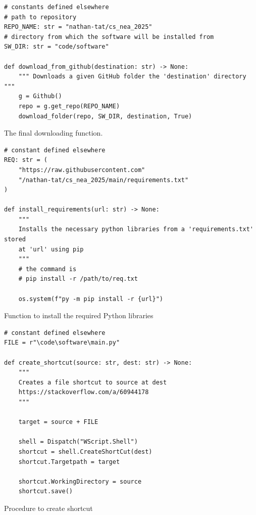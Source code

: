 \documentclass[11pt]{article}
\begin{document}
        \newpage
        \begin{listing}[!ht]
            \begin{verbatim}
# constants defined elsewhere
# path to repository
REPO_NAME: str = "nathan-tat/cs_nea_2025"
# directory from which the software will be installed from 
SW_DIR: str = "code/software"

def download_from_github(destination: str) -> None:
    """ Downloads a given GitHub folder the 'destination' directory """
    g = Github()
    repo = g.get_repo(REPO_NAME)
    download_folder(repo, SW_DIR, destination, True)
            \end{verbatim}
            \caption{The final downloading function.}
            \label{sc:final_dl_func_c1}
        \end{listing}


        \newpage
        \begin{listing}[!ht]
            \begin{verbatim}
# constant defined elsewhere
REQ: str = (
    "https://raw.githubusercontent.com"
    "/nathan-tat/cs_nea_2025/main/requirements.txt"
)

def install_requirements(url: str) -> None:
    """ 
    Installs the necessary python libraries from a 'requirements.txt' stored  
    at 'url' using pip
    """
    # the command is 
    # pip install -r /path/to/req.txt
    
    os.system(f"py -m pip install -r {url}")
            \end{verbatim}
            \caption{Function to install the required Python libraries}
            \label{sc:install_reqs_fail1_c1}
        \end{listing}


        \newpage
        \begin{listing}[!h]
            \begin{verbatim}
# constant defined elsewhere
FILE = r"\code\software\main.py"

def create_shortcut(source: str, dest: str) -> None:
    """ 
    Creates a file shortcut to source at dest 
    https://stackoverflow.com/a/60944178
    """
    
    target = source + FILE
    
    shell = Dispatch("WScript.Shell")    
    shortcut = shell.CreateShortCut(dest)
    shortcut.Targetpath = target
    
    shortcut.WorkingDirectory = source
    shortcut.save()
            \end{verbatim}
            \caption{Procedure to create shortcut}
            \label{sc:create_shortcut_c1}
        \end{listing}


        
\end{document}
